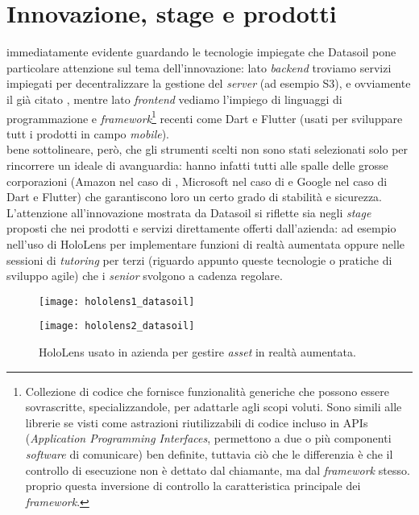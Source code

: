 \section{Innovazione, stage e prodotti}
\e{} immediatamente evidente guardando le tecnologie impiegate che Datasoil pone particolare attenzione sul tema dell'innovazione: lato \textit{backend} troviamo servizi \aws{} impiegati per decentralizzare la gestione del \textit{server} (ad esempio S3), e ovviamente il già citato \asa{}, mentre lato \textit{frontend} vediamo l'impiego di linguaggi di programmazione e \textit{framework}\footnote{Collezione di codice che fornisce funzionalità generiche che possono essere sovrascritte, specializzandole, per adattarle agli scopi voluti. Sono simili alle librerie se visti come astrazioni riutilizzabili di codice incluso in APIs (\textit{Application Programming Interfaces}, permettono a due o più componenti \textit{software} di comunicare) ben definite, tuttavia ciò che le differenzia è che il controllo di esecuzione non è dettato dal chiamante, ma dal \textit{framework} stesso. \e{} proprio questa inversione di controllo la caratteristica principale dei \textit{framework}.} recenti come Dart e Flutter (usati per sviluppare tutt i prodotti in campo \textit{mobile}).\\
\e{} bene sottolineare, però, che gli strumenti scelti non sono stati selezionati solo per rincorrere un ideale di avanguardia: hanno infatti tutti alle spalle delle grosse corporazioni (Amazon nel caso di \aws{}, Microsoft nel caso di \asa{} e Google nel caso di Dart e Flutter) che garantiscono loro un certo grado di stabilità e sicurezza.\\
L'attenzione all'innovazione mostrata da Datasoil si riflette sia negli \textit{stage} proposti che nei prodotti e servizi direttamente offerti dall'azienda: ad esempio nell'uso di HoloLens per implementare funzioni di realtà aumentata oppure nelle sessioni di \textit{tutoring} per terzi (riguardo appunto queste tecnologie o pratiche di sviluppo agile) che i \textit{senior} svolgono a cadenza regolare.
\begin{figure}[H]
    \centering
    \begin{minipage}{.5\textwidth}
      \centering
      \texttt{[image: hololens1\_datasoil]}
      \label{fig:test1}
    \end{minipage}%
    \begin{minipage}{.5\textwidth}
      \centering
      \texttt{[image: hololens2\_datasoil]}
    \end{minipage}
    \caption[HoloLens usato in azienda]{HoloLens usato in azienda per gestire \textit{asset} in realtà aumentata.\footnotemark}
\end{figure}
